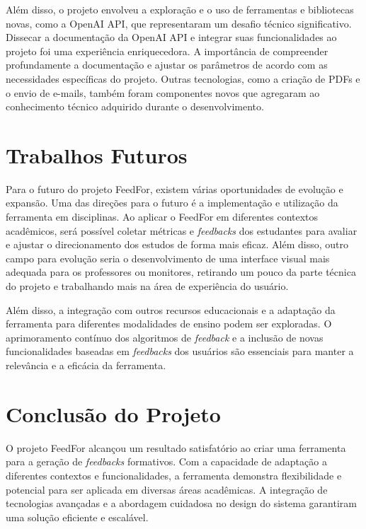 Além disso, o projeto envolveu a exploração e o uso de ferramentas e bibliotecas novas, como a OpenAI API, que representaram um desafio técnico significativo. Dissecar a documentação da OpenAI API e integrar suas funcionalidades ao projeto foi uma experiência enriquecedora. A importância de compreender profundamente a documentação e ajustar os parâmetros de acordo com as necessidades específicas do projeto. Outras tecnologias, como a criação de PDFs e o envio de e-mails, também foram componentes novos que agregaram ao conhecimento técnico adquirido durante o desenvolvimento.

\section{Trabalhos Futuros}

Para o futuro do projeto FeedFor, existem várias oportunidades de evolução e expansão. Uma das direções para o futuro é a implementação e utilização da ferramenta em disciplinas. Ao aplicar o FeedFor em diferentes contextos acadêmicos, será possível coletar métricas e \textit{feedbacks} dos estudantes para avaliar e ajustar o direcionamento dos estudos de forma mais eficaz. Além disso, outro campo para evolução seria o desenvolvimento de uma interface visual mais adequada para os professores ou monitores, retirando um pouco da parte técnica do projeto e trabalhando mais na área de experiência do usuário.

Além disso, a integração com outros recursos educacionais e a adaptação da ferramenta para diferentes modalidades de ensino podem ser exploradas. O aprimoramento contínuo dos algoritmos de \textit{feedback} e a inclusão de novas funcionalidades baseadas em \textit{feedbacks} dos usuários são essenciais para manter a relevância e a eficácia da ferramenta.

\section{Conclusão do Projeto}

O projeto FeedFor alcançou um resultado satisfatório ao criar uma ferramenta para a geração de \textit{feedbacks} formativos. Com a capacidade de adaptação a diferentes contextos e funcionalidades, a ferramenta demonstra flexibilidade e potencial para ser aplicada em diversas áreas acadêmicas. A integração de tecnologias avançadas e a abordagem cuidadosa no design do sistema garantiram uma solução eficiente e escalável.

